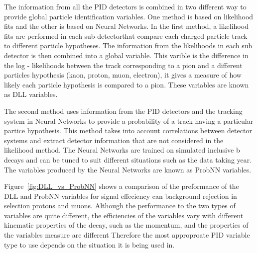 The information from all the PID detectors is combined in two different way to provide global particle identification variables. One method is based on likelihood fits and the other is based on Neural Networks. In the first method, a likelihood fits are performed in each sub-detectorthat compare each charged particle track to different particle hypotheses. The information from the likelihoods in each sub detector is then combined into a global variable. This varible is the difference in the log - likelihoods between the track corresponding to a pion and a different particles hypothesis (kaon, proton, muon, electron), it gives a measure of how likely each particle hypothesis is compared to a pion. These variables are known as DLL variables. 




The second method uses information from the PID detectors and the tracking system in Neural Networks to provide a probability of a track having a particular partice hypothesis. This method takes into account correlations between detector systems and extract detector information that are not considered in the likelihood method. The Neural Networks are trained on simulated inclusive b decays and can be tuned to suit different situations such as the data taking year. The variables produced by the Neural Networks are known as ProbNN variables. 


Figure~\ref{fig:DLL_vs_ProbNN} shows a comparison of the preformance of the DLL and ProbNN variables for signal effeciency can background rejection in selection protons and muons. Although the performance to the two types of variables are quite different, the efficiencies of the variables vary with different kinematic properties of the decay, such as the momentum, and the properties of the variables measure are different Therefore the most approproate PID variable type to use depends on the situation it is being used in. 




